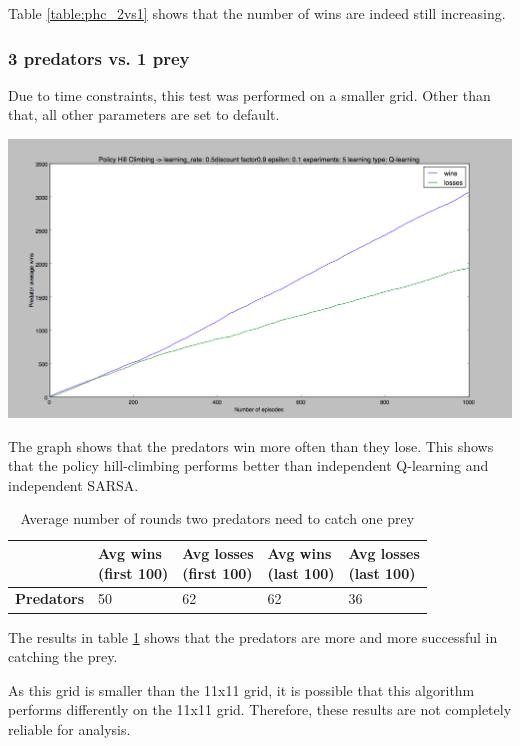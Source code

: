 Table \ref{table:phc_2vs1} shows that the number of wins are indeed still increasing.

\subsubsection{3 predators vs. 1 prey}
Due to time constraints, this test was performed on a smaller grid. Other than that, all other parameters are set to default. 

\begin{center}
	\includegraphics[scale=0.3]{phc_3predators_5by5_graph}
	\label{graph:phc_3v1}
\end{center}

The graph shows that the predators win more often than they lose. This shows that the policy hill-climbing performs better than independent Q-learning and independent SARSA.

\begin{table}[H]
\begin{center}
\begin{tabular}{| l | l | l | l | l |}
\hline
 & \parbox{2cm}{\textbf{Avg wins \\ (first 100)}} & \parbox{2cm}{\textbf{Avg losses \\ (first 100)}} & \parbox{2cm}{\textbf{Avg wins \\ (last 100)}} & \parbox{2cm}{\textbf{Avg losses \\ (last 100)}} \\
\hline
\textbf{Predators} & 50 & 62 & 62 & 36 \\
\hline
\end{tabular}
\caption{Average number of rounds two predators need to catch one prey}
\label{table:phc_3vs1}
\end{center}
\end{table}

The results in table \ref{table:phc_3vs1} shows that the predators are more and more successful in catching the prey. 

As this grid is smaller than the 11x11 grid, it is possible that this algorithm performs differently on the 11x11 grid. Therefore, these results are not completely reliable for analysis.